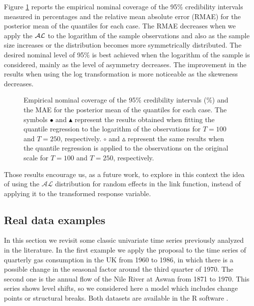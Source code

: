 \documentclass[12pt,a4paper]{article}\usepackage[]{graphicx}\usepackage[]{color}\usepackage{subfigure}
\begin{document}
Figure \ref{simul_gamma} reports the empirical nominal coverage of the 95\% credibility intervals measured in percentages and the relative mean absolute error (RMAE) for the posterior mean of the quantiles for each case.    
The RMAE decreases when we apply the $\cal{AL}$ to the logarithm of the sample observations and also as the sample size increases or the distribution becomes more symmetrically  distributed. The desired nominal level of 95\% is best achieved when the logarithm of the sample is considered, mainly as the level of asymmetry decreases. The improvement in the results when using the log transformation is more noticeable as the skeweness decreases.

\clearpage

 \begin{figure}[h!]
 \begin{center}
  \end{center}
 \vspace{-0.7 cm}\caption{Empirical nominal coverage of the 95\% credibility intervals (\%)
and the MAE for the posterior mean of the quantiles for each case. The symbols $\bullet$ and $\blacktriangle$ represent the results obtained when fitting the 
quantile regression to the logarithm of the observations for $T=100$ and $T=250$, respectively. 
$\circ$ and $\vartriangle$ represent the same results when the quantile regression is applied to the observations on the original scale 
for $T=100$ and $T=250$, respectively.}\label{simul_gamma}
 \end{figure}

Those results encourage us, as a future work, to explore in this context the idea of using the $\mathcal{AL}$ distribution for random
effects in the link function, instead of applying it to the transformed response variable.


\subsection{Real data examples} 

In this section we revisit some classic univariate time series previously analyzed in the literature. In the first example we apply the proposal to the time series of quarterly gas consumption in the UK from 1960 to 1986, in which there is a possible change in the seasonal factor around the third quarter of 1970. 
The second one is the annual flow of the Nile River at Aswan from 1871 to 1970. 
This series shows level shifts, so we considered here a model which includes change points or structural breaks. 
Both datasets are available in the R software \cite{teamR}.
\end{document}
